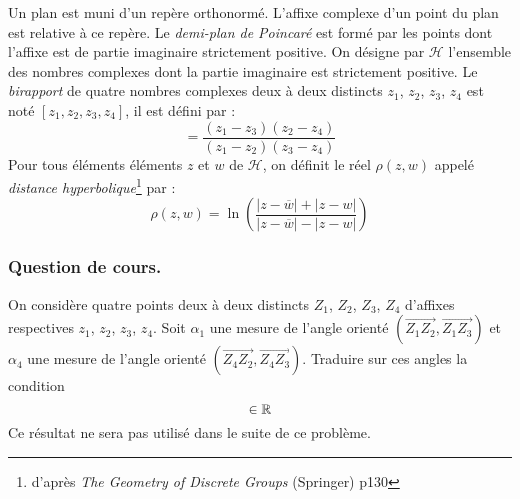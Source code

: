 Un plan est muni d'un repère orthonormé. L'affixe complexe d'un point du plan est relative à ce repère.\newline
Le \emph{demi-plan de Poincaré} est formé par les points dont l'affixe est de partie imaginaire strictement positive. On désigne par $\mathcal H$ l'ensemble des nombres complexes dont la partie imaginaire est strictement positive.\newline
Le \emph{birapport} de quatre nombres complexes deux à deux distincts $z_1$, $z_2$, $z_3$, $z_4$  est noté $[z_1,z_2,z_3,z_4]$, il est défini par :
\begin{displaymath}
 [z_1,z_2,z_3,z_4]=\dfrac{(z_1-z_3)(z_2-z_4)}{(z_1-z_2)(z_3-z_4)}
\end{displaymath}
Pour tous éléments éléments $z$ et $w$ de $\mathcal H$, on définit le réel $\rho(z,w)$ appelé \emph{distance hyperbolique}\footnote{d'après \textit{The Geometry of Discrete Groups} (Springer) p130} par :
\begin{displaymath}
 \rho(z,w) = \ln\left( \dfrac{|z-\overline{w}|+|z-w|}{|z-\overline{w}|-|z-w|}\right) 
\end{displaymath}

\subsubsection*{Question de cours.}
On considère quatre points deux à deux distincts $Z_1$, $Z_2$, $Z_3$, $Z_4$ d'affixes respectives $z_1$, $z_2$, $z_3$, $z_4$. Soit $\alpha_1$ une mesure de l'angle orienté $(\overrightarrow{Z_1Z_2},\overrightarrow{Z_1Z_3})$ et $\alpha_4$ une mesure de l'angle orienté $(\overrightarrow{Z_4Z_2},\overrightarrow{Z_4Z_3})$.\newline
Traduire sur ces angles la condition
\begin{displaymath}
 [z_1,z_2,z_3,z_4] \in \R
\end{displaymath}
Ce résultat ne sera pas utilisé dans le suite de ce problème.


